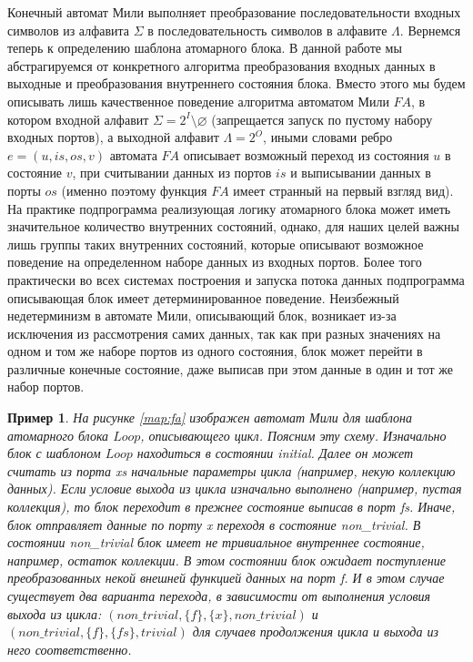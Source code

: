 \documentclass[10pt,a4paper]{article}
\newtheorem{example}{Пример}
\newcommand{\FA}{F\!A}
\begin{document}
Конечный автомат Мили выполняет преобразование последовательности входных символов из алфавита $\Sigma$ в последовательность символов в алфавите $\Lambda$.
Вернемся теперь к определению шаблона атомарного блока. В данной работе мы абстрагируемся от конкретного алгоритма преобразования входных данных в выходные
и преобразования внутреннего состояния блока. Вместо этого мы будем описывать лишь качественное поведение алгоритма автоматом Мили $\FA$, в котором входной алфавит
$\Sigma = 2^I \setminus \varnothing$ (запрещается запуск по пустому набору входных портов),
а выходной алфавит $\Lambda = 2^O$, иными словами ребро $e = (u, is, os, v)$ автомата $\FA$ описывает возможный переход из состояния $u$ в состояние $v$,
при считывании данных из портов $is$ и выписывании данных в порты $os$ (именно поэтому функция $\FA$ имеет странный на первый взгляд вид).
На практике подпрограмма реализующая логику атомарного блока может иметь значительное количество внутренних состояний,
однако, для наших целей важны лишь группы таких внутренних состояний, которые описывают возможное поведение на определенном наборе данных из входных портов.
Более того практически во всех системах построения и запуска потока данных подпрограмма описывающая блок имеет детерминированное поведение.
Неизбежный недетерминизм в автомате Мили, описывающий блок, возникает из-за исключения из рассмотрения самих данных,
так как при разных значениях на одном и том же наборе портов из одного состояния, блок может перейти в различные конечные состояние,
даже выписав при этом данные в один и тот же набор портов.

\begin{example}
  На рисунке \ref{map:fa} изображен автомат Мили для шаблона атомарного блока $Loop$, описывающего цикл. Поясним эту схему.
  Изначально блок с шаблоном $Loop$ находиться в состоянии \textit{initial}.
  Далее он может считать из порта \textit{xs} начальные параметры цикла (например, некую коллекцию данных).
  Если условие выхода из цикла изначально выполнено (например, пустая коллекция), то блок переходит в прежнее состояние выписав в порт \textit{fs}.
  Иначе, блок отправляет данные по порту \textit{x} переходя в состояние \textit{non\_trivial}. В состоянии \textit{non\_trivial} блок имеет не тривиальное внутреннее состояние,
  например, остаток коллекции. В этом состоянии блок ожидает поступление преобразованных некой внешней функцией данных на порт \textit{f}.
  И в этом случае существует два варианта перехода, в зависимости от выполнения условия выхода из цикла:
  $(non\_trivial, \{f\}, \{x\}, non\_trivial)$ и $(non\_trivial, \{f\}, \{fs\}, trivial)$ для случаев продолжения цикла и выхода из него соответственно.
\end{example}
\end{document}
